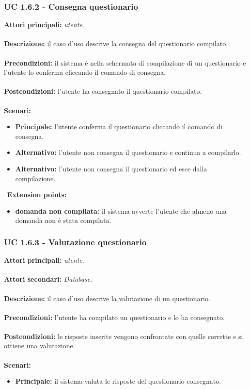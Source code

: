 \documentclass[a4paper,11pt]{article}
\begin{document}
\subsubsection{UC 1.6.2 - Consegna questionario}

\textbf{Attori principali:} \textit{utente}.\\
\\
\textbf{Descrizione:} il caso d'uso descrive la consegna del questionario compilato. \\
\\
\textbf{Precondizioni:} il sistema è nella schermata di compilazione di un questionario e l'utente lo conferma cliccando il comando di consegna.\\
\\
\textbf{Postcondizioni:} l'utente ha consegnato il questionario compilato. \\
\\
\textbf{Scenari:}
\begin{itemize}
\item \textbf{Principale:} l'utente conferma il questionario cliccando il comando di consegna.
\item \textbf{Alternativo:} l'utente non consegna il questionario e continua a compilarlo. \\
\item \textbf{Alternativo:} l'utente non consegna il questionario ed esce dalla compilazione.\\ 
\end{itemize}
\
\textbf{Extension points:}
\begin{itemize}
\item \textbf{domanda non compilata:} il sistema avverte l'utente che almeno una domanda non è stata compilata.
\end{itemize}
\vspace{6 mm}
\subsubsection{UC 1.6.3 - Valutazione questionario}

\textbf{Attori principali:} \textit{utente}.\\
\ \\
\textbf{Attori secondari:} \textit{Database}.\\
\\
\textbf{Descrizione:} il caso d'uso descrive la valutazione di un questionario. \\
\\
\textbf{Precondizioni:} l'utente ha compilato un questionario e lo ha consegnato.\\
\\
\textbf{Postcondizioni:} le risposte inserite vengono confrontate con quelle corrette e si ottiene una valutazione. \\
\\
\textbf{Scenari:}
\begin{itemize}
\item \textbf{Principale:} il sistema valuta le risposte del questionario consegnato.
\end{itemize}
\vspace{6 mm}
\end{document}
